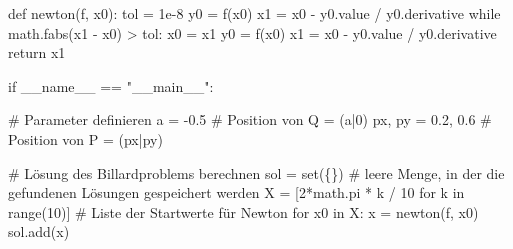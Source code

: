\documentclass[
  letterpaper,
  DIV=11,
  oneside]{scrreprt}
\newenvironment{Shaded}{\begin{snugshade}}{\end{snugshade}}
\newcommand{\BuiltInTok}[1]{\textcolor[rgb]{0.00,0.23,0.31}{#1}}
\newcommand{\CommentTok}[1]{\textcolor[rgb]{0.37,0.37,0.37}{#1}}
\newcommand{\ControlFlowTok}[1]{\textcolor[rgb]{0.00,0.23,0.31}{#1}}
\newcommand{\DecValTok}[1]{\textcolor[rgb]{0.68,0.00,0.00}{#1}}
\newcommand{\FloatTok}[1]{\textcolor[rgb]{0.68,0.00,0.00}{#1}}
\newcommand{\KeywordTok}[1]{\textcolor[rgb]{0.00,0.23,0.31}{#1}}
\newcommand{\NormalTok}[1]{\textcolor[rgb]{0.00,0.23,0.31}{#1}}
\newcommand{\OperatorTok}[1]{\textcolor[rgb]{0.37,0.37,0.37}{#1}}
\newcommand{\StringTok}[1]{\textcolor[rgb]{0.13,0.47,0.30}{#1}}
\newcommand{\VariableTok}[1]{\textcolor[rgb]{0.07,0.07,0.07}{#1}}
\theoremstyle{definition}
\theoremstyle{definition}
\theoremstyle{remark}
\begin{document}
\begin{tcolorbox}
\begin{Shaded}
\begin{Highlighting}[]
\KeywordTok{def}\NormalTok{ newton(f, x0):}
\NormalTok{    tol }\OperatorTok{=} \FloatTok{1e{-}8}
\NormalTok{    y0 }\OperatorTok{=}\NormalTok{ f(x0)}
\NormalTok{    x1 }\OperatorTok{=}\NormalTok{ x0 }\OperatorTok{{-}}\NormalTok{ y0.value }\OperatorTok{/}\NormalTok{ y0.derivative}
    \ControlFlowTok{while}\NormalTok{ math.fabs(x1 }\OperatorTok{{-}}\NormalTok{ x0) }\OperatorTok{\textgreater{}}\NormalTok{ tol:}
\NormalTok{        x0 }\OperatorTok{=}\NormalTok{ x1}
\NormalTok{        y0 }\OperatorTok{=}\NormalTok{ f(x0)}
\NormalTok{        x1 }\OperatorTok{=}\NormalTok{ x0 }\OperatorTok{{-}}\NormalTok{ y0.value }\OperatorTok{/}\NormalTok{ y0.derivative}
    \ControlFlowTok{return}\NormalTok{ x1}

\ControlFlowTok{if} \VariableTok{\_\_name\_\_} \OperatorTok{==} \StringTok{"\_\_main\_\_"}\NormalTok{:}

    \CommentTok{\# Parameter definieren}
\NormalTok{    a }\OperatorTok{=} \OperatorTok{{-}}\FloatTok{0.5}          \CommentTok{\# Position von Q = (a|0)}
\NormalTok{    px, py }\OperatorTok{=} \FloatTok{0.2}\NormalTok{, }\FloatTok{0.6} \CommentTok{\# Position von P = (px|py)}

    \CommentTok{\# Lösung des Billardproblems berechnen}
\NormalTok{    sol }\OperatorTok{=} \BuiltInTok{set}\NormalTok{(\{\}) }\CommentTok{\# leere Menge, in der die gefundenen Lösungen gespeichert werden}
\NormalTok{    X }\OperatorTok{=}\NormalTok{ [}\DecValTok{2}\OperatorTok{*}\NormalTok{math.pi }\OperatorTok{*}\NormalTok{ k }\OperatorTok{/} \DecValTok{10} \ControlFlowTok{for}\NormalTok{ k }\KeywordTok{in} \BuiltInTok{range}\NormalTok{(}\DecValTok{10}\NormalTok{)]  }\CommentTok{\# Liste der Startwerte für Newton}
    \ControlFlowTok{for}\NormalTok{ x0 }\KeywordTok{in}\NormalTok{ X:}
\NormalTok{        x }\OperatorTok{=}\NormalTok{ newton(f, x0)}
\NormalTok{        sol.add(x)}


\end{Highlighting}
\end{Shaded}
\end{tcolorbox}
\end{document}
